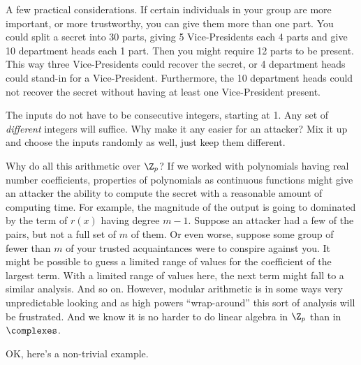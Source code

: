 %
A few practical considerations.  If certain individuals in your group are more important, or more trustworthy, you can give them more than one part.  You could split a secret into 30 parts, giving 5 Vice-Presidents each 4 parts and give 10 department heads each 1 part.  Then you might require 12 parts to be present.  This way three Vice-Presidents could recover the secret, or 4 department heads could stand-in for a Vice-President.  Furthermore, the 10 department heads could not recover the secret without having at least one Vice-President present.\par
%
The inputs do not have to be consecutive integers, starting at 1.  Any set of {\em different} integers will suffice.  Why make it any easier for an attacker?  Mix it up and choose the inputs randomly as well, just keep them different.\par
%
Why do all this arithmetic over $\Z_p$?  If we worked with polynomials having real number coefficients, properties of polynomials as continuous functions might give an attacker the ability to compute the secret with a reasonable amount of computing time.  For example, the magnitude of the output is going to dominated by the term of $r(x)$ having degree $m-1$.  Suppose an attacker had a few of the pairs, but not a full set of $m$ of them.  Or even worse, suppose some group of fewer than $m$ of your trusted acquaintances were to conspire against you.  It might be possible to guess a limited range of values for the coefficient of the largest term.  With a limited range of values here, the next term might fall to a similar analysis.  And so on.  However, modular arithmetic is in some ways very unpredictable looking and as high powers ``wrap-around'' this sort of analysis will be frustrated.  And we know it is no harder to do linear algebra in $\Z_p$ than in $\complexes$.\par
%
OK, here's a non-trivial example.
%
